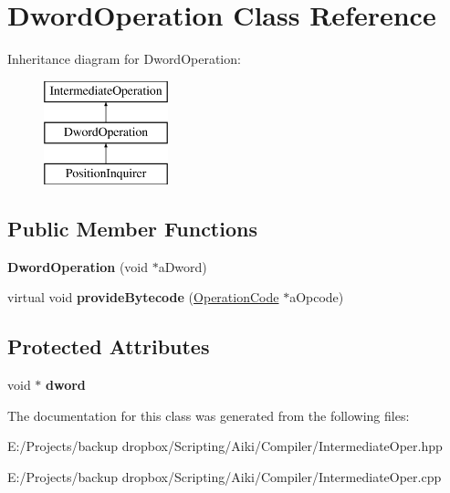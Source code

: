 \hypertarget{a00005}{\section{Dword\+Operation Class Reference}
\label{a00005}
}
Inheritance diagram for Dword\+Operation\+:\begin{figure}[H]
\begin{center}
\leavevmode
\includegraphics[height=3.000000cm]{dd/dad/a00005}
\end{center}
\end{figure}
\subsection*{Public Member Functions}
\begin{DoxyCompactItemize}
\item 
\hypertarget{a00005_a5dd015cd5a7d49768cfa1fcb70e0fe91}{{\bfseries Dword\+Operation} (void $\ast$a\+Dword)}\label{a00005_a5dd015cd5a7d49768cfa1fcb70e0fe91}

\item 
\hypertarget{a00005_abd70e7feb092ceb2c28c836addfb4ba4}{virtual void {\bfseries provide\+Bytecode} (\hyperlink{a00015}{Operation\+Code} $\ast$a\+Opcode)}\label{a00005_abd70e7feb092ceb2c28c836addfb4ba4}

\end{DoxyCompactItemize}
\subsection*{Protected Attributes}
\begin{DoxyCompactItemize}
\item 
\hypertarget{a00005_a78898cf72cefdba90a87b6ec9b1d1708}{void $\ast$ {\bfseries dword}}\label{a00005_a78898cf72cefdba90a87b6ec9b1d1708}

\end{DoxyCompactItemize}


The documentation for this class was generated from the following files\+:\begin{DoxyCompactItemize}
\item 
E\+:/\+Projects/backup dropbox/\+Scripting/\+Aiki/\+Compiler/Intermediate\+Oper.\+hpp\item 
E\+:/\+Projects/backup dropbox/\+Scripting/\+Aiki/\+Compiler/Intermediate\+Oper.\+cpp\end{DoxyCompactItemize}
